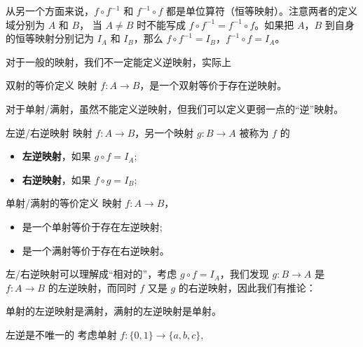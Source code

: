 从另一个方面来说，$f\circ f^{-1}$ 和 $f^{-1}\circ f$ 都是单位算符（恒等映射）。注意两者的定义域分别为 $A$ 和 $B$， 当 $A \ne B$ 时不能写成 $f\circ f^{-1} = f^{-1}\circ f$。如果把 $A$，$B$ 到自身的恒等映射分别记为 $I_A$ 和 $I_B$，那么 $f\circ f^{-1}=I_B$，$f^{-1}\circ f=I_A$。

对于一般的映射，我们不一定能定义逆映射，实际上

\begin{theorem}{双射的等价定义}
映射 $f: A \to B$，是一个双射等价于存在逆映射。
\end{theorem}

对于单射/满射，虽然不能定义逆映射，但我们可以定义更弱一点的“逆”映射。

\begin{definition}{左逆/右逆映射}
映射 $f: A \to B$，另一个映射 $g: B \to A$ 被称为 $f$ 的
\begin{itemize}
\item \textbf{左逆映射}，如果 $g \circ f = I_A$;
\item \textbf{右逆映射}，如果 $f \circ g = I_B$;
\end{itemize}

\begin{theorem}{单射/满射的等价定义}
映射 $f: A \to B$，
\begin{itemize}
\item 是一个单射等价于存在左逆映射;
\item 是一个满射等价于存在右逆映射。
\end{itemize}
\end{theorem}

左/右逆映射可以理解成“相对的”，考虑 $g \circ f = I_A$，我们发现 $g: B \to A$ 是 $f: A \to B$ 的左逆映射，而同时 $f$ 又是 $g$ 的右逆映射，因此我们有推论：
\begin{corollary}{}
单射的左逆映射是满射，满射的左逆映射是单射。
\end{corollary}

\begin{example}{左逆是不唯一的}
考虑单射 $f: \{0, 1\} \to \{a, b, c\}$,
$$
\end{example}


\end{definition}


